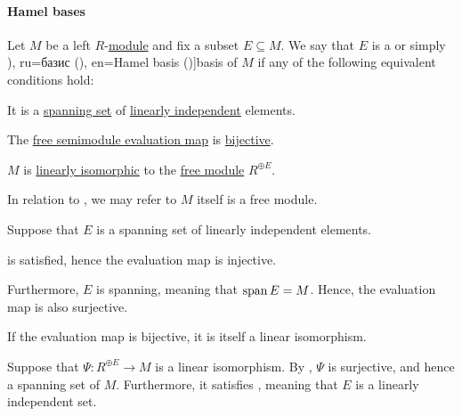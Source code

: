 \paragraph{Hamel bases}

\begin{definition}\label{def:hamel_basis}\mimprovised
  Let \( M \) be a left \( R \)-\hyperref[def:module]{module} and fix a subset \( E \subseteq M \). We say that \( E \) is a  or simply \term[bg=базис (\cite[100]{Обрешков1962ВисшаАлгебра}), ru=базис (\cite[\S 3.7]{Тыртышников2007ЛинейнаяАлгебра}), en=Hamel basis (\cite[example B-2.12]{Rotman2015AdvancedModernAlgebraPart1})]{basis} of \( M \) if any of the following equivalent conditions hold:

  \begin{thmenum}
     It is a \hyperref[thm:span_via_linear_combinations]{spanning set} of \hyperref[def:linear_dependence]{linearly independent} elements.

     The \hyperref[thm:free_semimodule_universal_property]{free semimodule evaluation map} is \hyperref[def:function_invertibility/bijective]{bijective}.

     \( M \) is \hyperref[def:linear_function]{linearly isomorphic} to the \hyperref[def:free_semimodule]{free module} \( R^{\oplus E} \).
  \end{thmenum}
\end{definition}
\begin{comments}
  \item In relation to , we may refer to \( M \) itself is a free module.
\end{comments}
\begin{defproof}
   Suppose that \( E \) is a spanning set of linearly independent elements.

   is satisfied, hence the evaluation map is injective.

  Furthermore, \( E \) is spanning, meaning that \( \operatorname{span} E = M \). Hence, the evaluation map is also surjective.

   If the evaluation map is bijective, it is itself a linear isomorphism.

   Suppose that \( \Psi: R^{\oplus E} \to M \) is a linear isomorphism. By , \( \Psi \) is surjective, and hence a spanning set of \( M \). Furthermore, it satisfies , meaning that \( E \) is a linearly independent set.
\end{defproof}

